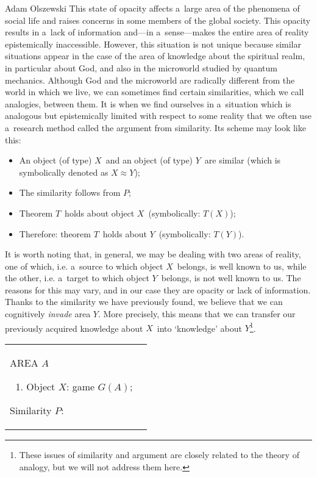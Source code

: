 \begin{artengenv}{Adam Olszewski}
This state of opacity affects a~large area of the phenomena of social life and raises concerns in some members of the global society. This opacity results in a~lack of information and—in a~sense—makes the entire area of reality epistemically inaccessible. However, this situation is not unique because similar situations appear in the case of the area of knowledge about the spiritual realm, in particular about God, and also in the microworld studied by quantum mechanics. Although God and the microworld are radically different from the world in which we live, we can sometimes find certain similarities, which we call analogies, between them. It is when we find ourselves in a~situation which is analogous but epistemically limited with respect to some reality that we often use a~research method called the argument from similarity. Its scheme may look like this:
\begin{itemize}
\item An object (of type) $X$~and an object (of type) $Y$~are similar (which is symbolically denoted as $X\approx Y$);
\item The similarity follows from $P$;
\item Theorem $T$~holds about object $X$~(symbolically: $T(X)$);
\item Therefore: theorem $T$~holds about $Y$~(symbolically: $T(Y)$).
\end{itemize}
It is worth noting that, in general, we may be dealing with two areas of reality, one of which, i.e. a~source to which object $X$~belongs, is well known to us, while the other, i.e. a~target to which object $Y$~belongs, is not well known to us. The reasons for this may vary, and in our case they are opacity or lack of information. Thanks to the similarity we have previously found, we believe that we can cognitively \textit{invade} area $Y$. More precisely, this means that we can transfer our previously acquired knowledge about $X$~into ‘knowledge' about $Y$\footnote{These issues of similarity and argument are closely related to the theory of analogy, but we will not address them here.}.





\begin{table}[H]
\begin{small}
\begin{tabular}{|p{}|p{}|}%
\hline%
AREA $A$

\begin{enumerate}[wide, labelwidth=!, labelindent=0pt]
\item Object $X$: game $G(A)$;
\end{enumerate}
Similarity $P$:


\end{tabular}
\end{small}
\end{table}
\end{artengenv}
